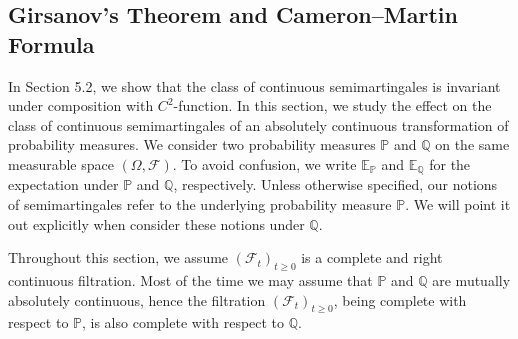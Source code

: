 \documentclass{article}
\numberwithin{equation}{section}
\newcommand{\E}{\mathbb{E}}
\newcommand{\bbP}{\mathbb{P}}
\newcommand{\bbQ}{\mathbb{Q}}
\theoremstyle{plain}
\theoremstyle{definition}
\begin{document}
\subsection{Girsanov's Theorem and Cameron–Martin Formula}
In Section 5.2, we show that the class of continuous semimartingales is invariant under composition with $C^2$-function. In this section, we study the effect on the class of continuous semimartingales of an absolutely continuous transformation of probability measures. We consider two probability measures $\bbP$ and $\bbQ$ on the same measurable space $(\Omega,\mathscr{F})$. To avoid confusion, we write $\E_\bbP$ and $\E_\bbQ$ for the expectation under $\bbP$ and $\bbQ$, respectively. Unless otherwise specified, our notions of semimartingales refer to the underlying probability measure $\bbP$. We will point it out explicitly when consider these notions under $\bbQ$.

Throughout this section, we assume $(\mathscr{F}_t)_{t\geq 0}$ is a complete and right continuous filtration. Most of the time we may assume that $\bbP$ and $\bbQ$ are mutually absolutely continuous, hence the filtration $(\mathscr{F}_t)_{t\geq 0}$, being complete with respect to $\bbP$, is also complete with respect to $\bbQ$.
\end{document}
